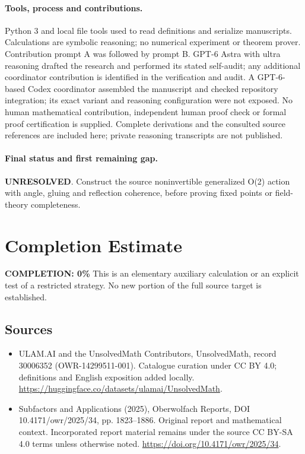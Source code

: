 \documentclass[11pt]{article}
\begin{document}
\paragraph{Tools, process and contributions.}
Python 3 and local file tools used to read definitions and serialize manuscripts. Calculations are symbolic reasoning; no numerical experiment or theorem prover. Contribution prompt A was followed by prompt B. GPT-6 Astra with ultra reasoning drafted the research and performed its stated self-audit; any additional coordinator contribution is identified in the verification and audit. A GPT-6-based Codex coordinator assembled the manuscript and checked repository integration; its exact variant and reasoning configuration were not exposed. No human mathematical contribution, independent human proof check or formal proof certification is supplied. Complete derivations and the consulted source references are included here; private reasoning transcripts are not published.

\paragraph{Final status and first remaining gap.}
\textbf{UNRESOLVED}. Construct the source noninvertible generalized O(2) action with angle, gluing and reflection coherence, before proving fixed points or field-theory completeness.

\section{Completion Estimate}
\noindent\textbf{COMPLETION: 0\%}
This is an elementary auxiliary calculation or an explicit test of a restricted strategy. No new portion of the full source target is established.

\subsection{Sources}
\begin{itemize}
\item[\hypertarget{source:30006352:1}{S1}] ULAM.AI and the UnsolvedMath Contributors, UnsolvedMath, record 30006352 (OWR-14299511-001). Catalogue curation under CC BY 4.0; definitions and English exposition added locally.
\url{https://huggingface.co/datasets/ulamai/UnsolvedMath}.
\item[\hypertarget{source:30006352:2}{S2}] Subfactors and Applications (2025), Oberwolfach Reports, DOI 10.4171/owr/2025/34, pp. 1823--1886. Original report and mathematical context. Incorporated report material remains under the source CC BY-SA 4.0 terms unless otherwise noted.
\url{https://doi.org/10.4171/owr/2025/34}.
\end{itemize}
\label{end:30006352}
\end{document}
